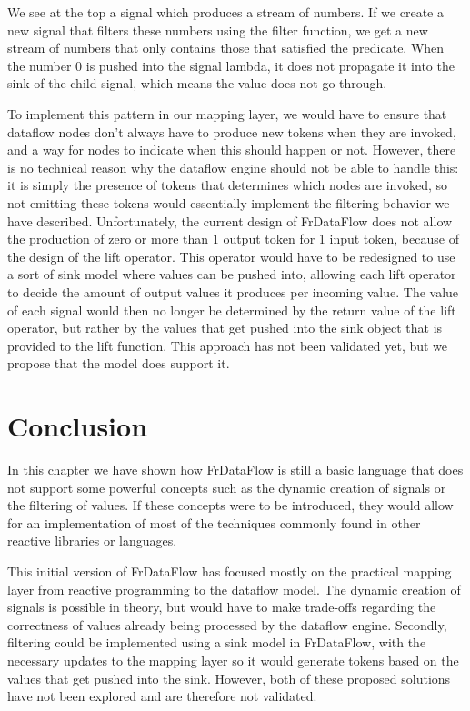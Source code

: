 We see at the top a signal which produces a stream of numbers. If we create a new signal that filters these numbers using the filter function, we get a new stream of numbers that only contains those that satisfied the predicate. When the number 0 is pushed into the signal lambda, it does not propagate it into the sink of the child signal, which means the value does not go through. 

To implement this pattern in our mapping layer, we would have to ensure that dataflow nodes don't always have to produce new tokens when they are invoked, and a way for nodes to indicate when this should happen or not. However, there is no technical reason why the dataflow engine should not be able to handle this: it is simply the presence of tokens that determines which nodes are invoked, so not emitting these tokens would essentially implement the filtering behavior we have described. Unfortunately, the current design of FrDataFlow does not allow the production of zero or more than 1 output token for 1 input token, because of the design of the lift operator. This operator would have to be redesigned to use a sort of sink model where values can be pushed into, allowing each lift operator to decide the amount of output values it produces per incoming value. The value of each signal would then no longer be determined by the return value of the lift operator, but rather by the values that get pushed into the sink object that is provided to the lift function. This approach has not been validated yet, but we propose that the model does support it.


\section{Conclusion}

In this chapter we have shown how FrDataFlow is still a basic language that does not support some powerful concepts such as the dynamic creation of signals or the filtering of values.
If these concepts were to be introduced, they would allow for an implementation of most of the techniques commonly found in other reactive libraries or languages.

This initial version of FrDataFlow has focused mostly on the practical mapping layer from reactive programming to the dataflow model. The dynamic creation of signals is possible in theory, but would have to make trade-offs regarding the correctness of values already being processed by the dataflow engine. Secondly, filtering could be implemented using a sink model in FrDataFlow, with the necessary updates to the mapping layer so it would generate tokens based on the values that get pushed into the sink. However, both of these proposed solutions have not been explored and are therefore not validated.  